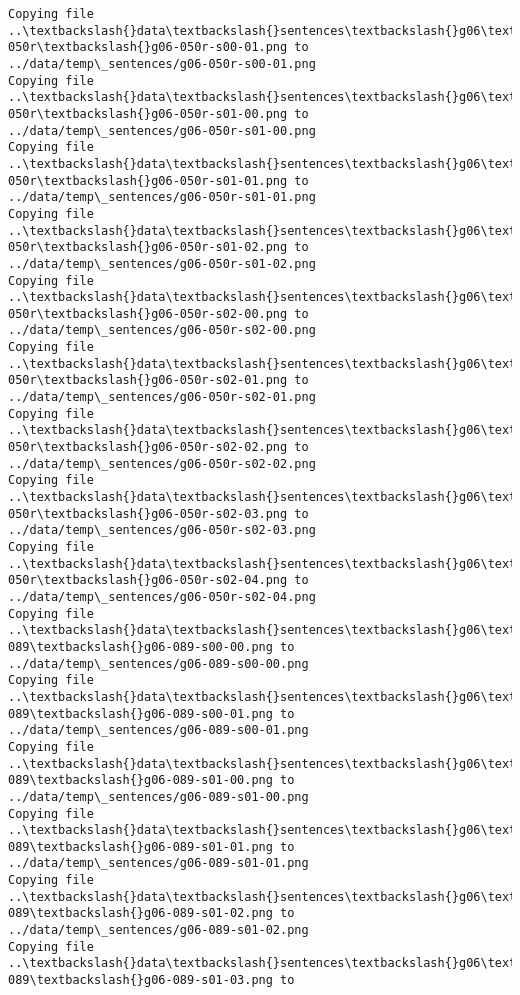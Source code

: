 \documentclass[11pt]{article}
\begin{document}
\begin{Verbatim}[commandchars=\\\{\}]
Copying file ..\textbackslash{}data\textbackslash{}sentences\textbackslash{}g06\textbackslash{}g06-050r\textbackslash{}g06-050r-s00-01.png to
../data/temp\_sentences/g06-050r-s00-01.png
Copying file ..\textbackslash{}data\textbackslash{}sentences\textbackslash{}g06\textbackslash{}g06-050r\textbackslash{}g06-050r-s01-00.png to
../data/temp\_sentences/g06-050r-s01-00.png
Copying file ..\textbackslash{}data\textbackslash{}sentences\textbackslash{}g06\textbackslash{}g06-050r\textbackslash{}g06-050r-s01-01.png to
../data/temp\_sentences/g06-050r-s01-01.png
Copying file ..\textbackslash{}data\textbackslash{}sentences\textbackslash{}g06\textbackslash{}g06-050r\textbackslash{}g06-050r-s01-02.png to
../data/temp\_sentences/g06-050r-s01-02.png
Copying file ..\textbackslash{}data\textbackslash{}sentences\textbackslash{}g06\textbackslash{}g06-050r\textbackslash{}g06-050r-s02-00.png to
../data/temp\_sentences/g06-050r-s02-00.png
Copying file ..\textbackslash{}data\textbackslash{}sentences\textbackslash{}g06\textbackslash{}g06-050r\textbackslash{}g06-050r-s02-01.png to
../data/temp\_sentences/g06-050r-s02-01.png
Copying file ..\textbackslash{}data\textbackslash{}sentences\textbackslash{}g06\textbackslash{}g06-050r\textbackslash{}g06-050r-s02-02.png to
../data/temp\_sentences/g06-050r-s02-02.png
Copying file ..\textbackslash{}data\textbackslash{}sentences\textbackslash{}g06\textbackslash{}g06-050r\textbackslash{}g06-050r-s02-03.png to
../data/temp\_sentences/g06-050r-s02-03.png
Copying file ..\textbackslash{}data\textbackslash{}sentences\textbackslash{}g06\textbackslash{}g06-050r\textbackslash{}g06-050r-s02-04.png to
../data/temp\_sentences/g06-050r-s02-04.png
Copying file ..\textbackslash{}data\textbackslash{}sentences\textbackslash{}g06\textbackslash{}g06-089\textbackslash{}g06-089-s00-00.png to
../data/temp\_sentences/g06-089-s00-00.png
Copying file ..\textbackslash{}data\textbackslash{}sentences\textbackslash{}g06\textbackslash{}g06-089\textbackslash{}g06-089-s00-01.png to
../data/temp\_sentences/g06-089-s00-01.png
Copying file ..\textbackslash{}data\textbackslash{}sentences\textbackslash{}g06\textbackslash{}g06-089\textbackslash{}g06-089-s01-00.png to
../data/temp\_sentences/g06-089-s01-00.png
Copying file ..\textbackslash{}data\textbackslash{}sentences\textbackslash{}g06\textbackslash{}g06-089\textbackslash{}g06-089-s01-01.png to
../data/temp\_sentences/g06-089-s01-01.png
Copying file ..\textbackslash{}data\textbackslash{}sentences\textbackslash{}g06\textbackslash{}g06-089\textbackslash{}g06-089-s01-02.png to
../data/temp\_sentences/g06-089-s01-02.png
Copying file ..\textbackslash{}data\textbackslash{}sentences\textbackslash{}g06\textbackslash{}g06-089\textbackslash{}g06-089-s01-03.png to

\end{Verbatim}
\end{document}
